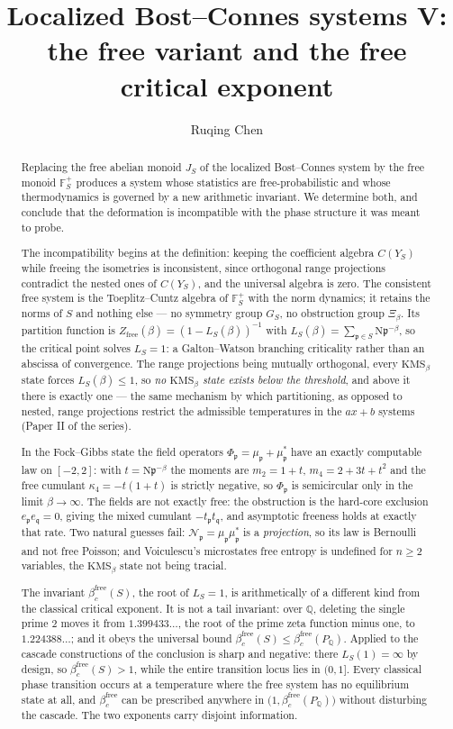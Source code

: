 \documentclass[11pt]{amsart}
\title[The free variant]{Localized Bost--Connes systems V:\\ the free variant and the free critical exponent}
\author{Ruqing Chen}
\date{}
\numberwithin{equation}{section}
\theoremstyle{definition}
\theoremstyle{remark}
\newcommand{\Q}{\mathbb{Q}}
\newcommand{\F}{\mathbb{F}}
\newcommand{\cN}{\mathcal{N}}
\newcommand{\pp}{\mathfrak{p}}
\newcommand{\qq}{\mathfrak{q}}
\newcommand{\Ns}{\mathrm{N}}
\newcommand{\bfree}{\beta_c^{\mathrm{free}}}
\begin{document}
\begin{abstract}
Replacing the free abelian monoid $J_S$ of the localized Bost--Connes system by the free
monoid $\F_S^+$ produces a system whose statistics are free-probabilistic and whose
thermodynamics is governed by a new arithmetic invariant. We determine both, and conclude
that the deformation is incompatible with the phase structure it was meant to probe.

The incompatibility begins at the definition: keeping the coefficient algebra $C(Y_S)$ while
freeing the isometries is inconsistent, since orthogonal range projections contradict the
nested ones of $C(Y_S)$, and the universal algebra is zero. The consistent free system is
the Toeplitz--Cuntz algebra of $\F_S^+$ with the norm dynamics; it retains the norms of
$S$ and nothing else --- no symmetry group $G_S$, no obstruction group $\Xi_\beta$. Its
partition function is $Z_{\mathrm{free}}(\beta)=(1-L_S(\beta))^{-1}$ with
$L_S(\beta)=\sum_{\pp\in S}\Ns\pp^{-\beta}$, so the critical point solves $L_S=1$: a
Galton--Watson branching criticality rather than an abscissa of convergence. The range
projections being mutually orthogonal, every $\mathrm{KMS}_\beta$ state forces
$L_S(\beta)\le1$, so \emph{no $\mathrm{KMS}_\beta$ state exists below the threshold}, and
above it there is exactly one --- the same mechanism by which partitioning, as opposed to
nested, range projections restrict the admissible temperatures in the $ax+b$ systems
(Paper II of the series).

In the Fock--Gibbs state the field operators $\Phi_\pp=\mu_\pp+\mu_\pp^*$ have an exactly
computable law on $[-2,2]$: with $t=\Ns\pp^{-\beta}$ the moments are $m_2=1+t$,
$m_4=2+3t+t^2$ and the free cumulant $\kappa_4=-t(1+t)$ is strictly negative, so
$\Phi_\pp$ is semicircular only in the limit $\beta\to\infty$. The fields are not exactly
free: the obstruction is the hard-core exclusion $e_\pp e_\qq=0$, giving the mixed cumulant
$-t_\pp t_\qq$, and asymptotic freeness holds at exactly that rate. Two natural guesses fail:
$\cN_\pp=\mu_\pp\mu_\pp^*$ is a \emph{projection}, so its law is Bernoulli and not free
Poisson; and Voiculescu's microstates free entropy is undefined for $n\ge2$ variables, the
$\mathrm{KMS}_\beta$ state not being tracial.

The invariant $\bfree(S)$, the root of $L_S=1$, is arithmetically of a different kind from
the classical critical exponent. It is not a tail invariant: over $\Q$, deleting the single
prime $2$ moves it from $1.399433\ldots$, the root of the prime zeta function minus one,
to $1.224388\ldots$; and it obeys the universal bound $\bfree(S)\le\bfree(P_\Q)$. Applied to
the cascade constructions of \cite{SeriesI} the conclusion is sharp and negative: there
$L_S(1)=\infty$ by design, so $\bfree(S)>1$, while the entire transition locus lies in
$(0,1]$. Every classical phase transition occurs at a temperature where the free system has no
equilibrium state at all, and $\bfree$ can be prescribed anywhere in $\bigl(1,\bfree(P_\Q)\bigr)$
without disturbing the cascade. The two exponents carry disjoint information.
\end{abstract}
\end{document}
